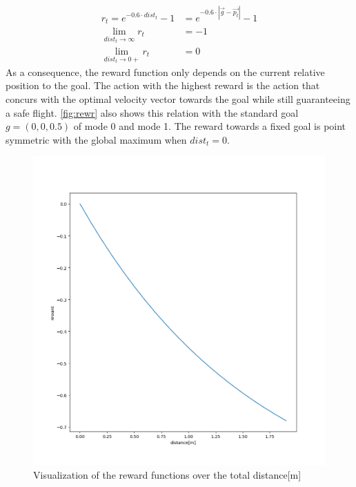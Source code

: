 \begin{align}
	r_t = e^{-0.6 \cdot dist_t} - 1 &= e^{-0.6 \cdot |\overrightarrow{g} - \overrightarrow{p_t}|} - 1 \label{eq:rew}\\
	\lim_{dist_t \to \infty} r_t &= -1\\
	\lim_{dist_t \to 0+} r_t &= 0
\end{align}
As a consequence, the reward function only depends on the current relative position to the goal. 
The action with the highest reward is the action that concurs with the optimal velocity vector towards the goal while still guaranteeing a safe flight. 
\cref{fig:rewr} also shows this relation with the standard goal $g=(0, 0, 0.5)$ of mode 0 and mode 1. The reward towards a fixed goal is 
point symmetric with the global maximum when $dist_t = 0$.

\newpage

\begin{figure}
	\centering
	\includegraphics[width= 0.5\linewidth]{figures/reward.png}
	\caption{Visualization of the reward functions over the total distance[m]}
	\label{fig:rewd}
\end{figure}

